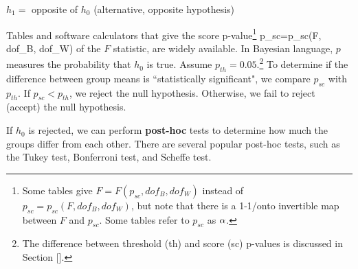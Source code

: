 $h_1=$ opposite of $h_0$  (alternative, opposite hypothesis)

Tables 
and 
software calculators that give 
the score p-value\footnote{Some tables give
$F=F(p_{sc}, dof_B, dof_W)$
instead of $p_{sc}=p_{sc}(F, dof_B, dof_W)$,
but note that there is a 1-1/onto 
invertible map between $F$ and $p_{sc}$.
Some tables refer  to $p_{sc}$
as $\alpha$.
} 
\beq
p_{sc}=p_{sc}(F, dof_B, dof_W)\eeq
of the $F$ statistic,
are widely available. 
In Bayesian language,
$p$
measures
the probability
that $h_0$ is true.
Assume $p_{th}=0.05$.\footnote{
The difference between 
threshold (th)
and score (sc) p-values
is discussed in Section [].}
To determine if the difference between group means is ``statistically significant", 
we compare $p_{sc}$ with $p_{th}$. 
If $p_{sc}<p_{th}$, we reject the null hypothesis.
Otherwise, we fail to reject (accept) the null hypothesis.

If $h_0$ is rejected,  we can  perform {\bf post-hoc} tests to determine how much 
the groups differ from each other.
There are several  popular post-hoc tests,
such as 
the
Tukey test,
Bonferroni test, and 
Scheffe test.
